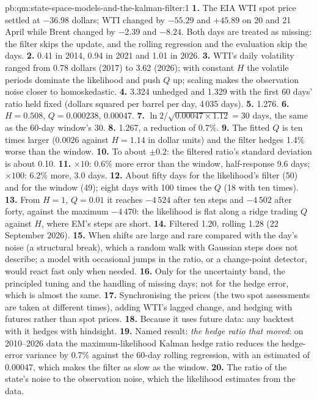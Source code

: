 \begin{solution}{pb:qm:state-space-models-and-the-kalman-filter:1}
\textbf{1.} The EIA WTI spot price settled at $-36.98$ dollars; WTI changed by $-55.29$ and $+45.89$ on 20 and 21 April while Brent changed by $-2.39$ and $-8.24$.
Both days are treated as missing: the filter skips the update, and the rolling regression and the evaluation skip the days.
\textbf{2.} 0.41 in 2014, 0.94 in 2021 and 1.01 in 2026.
\textbf{3.} WTI's daily volatility ranged from 0.78 dollars (2017) to 3.62 (2026); with constant $H$ the volatile periods dominate the likelihood and push $Q$ up;
scaling makes the observation noise closer to homoskedastic.
\textbf{4.} 3.324 unhedged and 1.329 with the first 60 days' ratio held fixed (dollars squared per barrel per day, 4\,035 days).
\textbf{5.} 1.276.
\textbf{6.} $H = 0.508$, $Q = 0.000238$,  0.00047.
\textbf{7.} $\ln2/\sqrt{0.00047 \times 1.12} = 30$ days, the same as the 60-day window's 30.
\textbf{8.} 1.267, a reduction of 0.7\%.
\textbf{9.} The fitted $Q$ is ten times larger (0.0026 against $H = 1.14$ in dollar units) and the filter hedges 1.4\% worse than the window.
\textbf{10.} To about $\pm 0.2$: the filtered ratio's standard deviation is about 0.10.
\textbf{11.} $\times 10$: 0.6\% more error than the window, half-response 9.6 days; $\times 100$: 6.2\% more, 3.0 days.
\textbf{12.} About fifty days for the likelihood's filter (50) and for the window (49); eight days with 100 times the $Q$ (18 with ten times).
\textbf{13.} From $H = 1$, $Q = 0.01$ it reaches $-4\,524$ after ten steps and $-4\,502$ after forty, against the maximum $-4\,470$: the likelihood is flat along a ridge
trading $Q$ against $H$, where EM's steps are short.
\textbf{14.} Filtered 1.20, rolling 1.28 (22 September 2026).
\textbf{15.} When shifts are large and rare compared with the day's noise (a structural break), which a random walk with Gaussian steps does not describe; a model with
occasional jumps in the ratio, or a change-point detector, would react fast only when needed.
\textbf{16.} Only for the uncertainty band, the principled tuning and the handling of missing days; not for the hedge error, which is almost the same.
\textbf{17.} Synchronising the prices (the two spot assessments are taken at different times), adding WTI's lagged change, and hedging with futures rather than
spot prices.
\textbf{18.} Because it uses future data: any backtest with it hedges with hindsight.
\textbf{19.} Named result: \emph{the hedge ratio that moved}: on 2010--2026 data the maximum-likelihood Kalman hedge ratio reduces the hedge-error variance by
0.7\% against the 60-day rolling regression, with an estimated  of 0.00047, which makes the filter as slow as the window.
\textbf{20.} The ratio of the state's noise to the observation noise, which the likelihood estimates from the data.
\end{solution}

